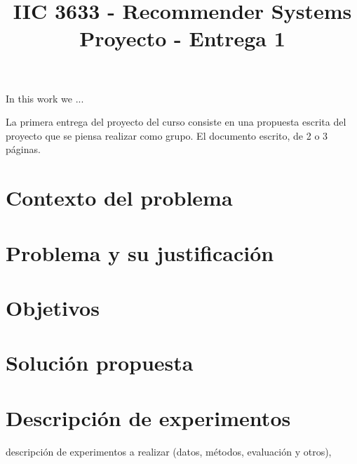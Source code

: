 \documentclass[letterpaper, 10 pt, conference]{ieeeconf}  %
\title{\LARGE \bf
IIC 3633 - Recommender Systems\\
Proyecto - Entrega 1
}
\begin{document}
\maketitle
\thispagestyle{empty}
\pagestyle{empty}



\justify
In this work we ...

La primera entrega del proyecto del curso consiste en una propuesta escrita del proyecto que se piensa realizar como grupo. El documento escrito, de 2 o 3 páginas.

\section{Contexto del problema}

\section{Problema y su justiﬁcación}

\section{Objetivos}

\section{Solución propuesta}

\section{Descripción de experimentos}
descripción de experimentos a realizar (datos, métodos, evaluación y otros),



\addtolength{\textheight}{-12cm}   %
\end{document}

